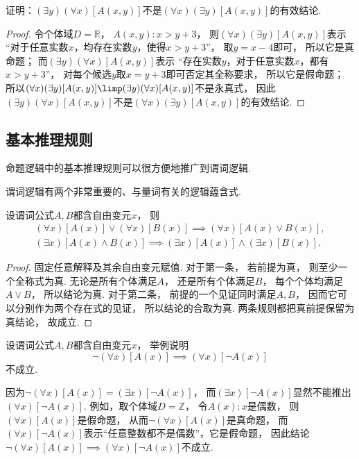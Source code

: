 \begin{example}
证明：\((\exists y)(\forall x)[A(x,y)]\)不是\((\forall x)(\exists y)[A(x,y)]\)的有效结论.
\begin{proof}
令个体域\(D=\mathbb{R}\)，
\(A(x,y): x>y+3\)，
则\((\forall x)(\exists y)[A(x,y)]\)表示
“对于任意实数\(x\)，均存在实数\(y\)，使得\(x>y+3\)”，
        取\(y=x-4\)即可，
        所以它是真命题；
而\((\exists y)(\forall x)[A(x,y)]\)表示
“存在实数\(y\)，对于任意实数\(x\)，都有\(x>y+3\)”，
        对每个候选\(y\)取\(x=y+3\)即可否定其全称要求，
        所以它是假命题；
所以\((\forall x)(\exists y)[A(x,y)] \limp (\exists y)(\forall x)[A(x,y)]\)不是永真式，
因此\((\exists y)(\forall x)[A(x,y)]\)不是\((\forall x)(\exists y)[A(x,y)]\)的有效结论.
\end{proof}
\end{example}

\subsection{基本推理规则}
命题逻辑中的基本推理规则可以很方便地推广到谓词逻辑.

谓词逻辑有两个非常重要的、与量词有关的逻辑蕴含式.
\begin{theorem}\label{theorem:一阶逻辑.基本推理规则}
设谓词公式\(A,B\)都含自由变元\(x\)，
则\begin{gather}
	(\forall x)[A(x)] \lor (\forall x)[B(x)]
	\implies (\forall x)[A(x) \lor B(x)], \\
	(\exists x)[A(x) \land B(x)]
	\implies (\exists x)[A(x)] \land (\exists x)[B(x)].
\end{gather}
    \begin{proof}
        固定任意解释及其余自由变元赋值.
        对于第一条，
        若前提为真，
        则至少一个全称式为真.
        无论是所有个体满足\(A\)，
        还是所有个体满足\(B\)，
        每个个体均满足\(A\lor B\)，
        所以结论为真.
        对于第二条，
        前提的一个见证同时满足\(A,B\)，
        因而它可以分别作为两个存在式的见证，
        所以结论的合取为真.
        两条规则都把真前提保留为真结论，
        故成立.
    \end{proof}
\end{theorem}

\begin{example}
设谓词公式\(A,B\)都含自由变元\(x\)，
举例说明\begin{equation*}
	\neg(\forall x)[A(x)] \implies (\forall x)[\neg A(x)]
\end{equation*}不成立.
\begin{solution}
因为\(
	\neg(\forall x)[A(x)]
	= (\exists x)[\neg A(x)]
\)，
而\((\exists x)[\neg A(x)]\)显然不能推出\((\forall x)[\neg A(x)]\).
例如，取个体域\(D = \mathbb{Z}\)，
令\(A(x): \text{$x$是偶数}\)，
则\((\forall x)[A(x)]\)是假命题，
从而\(\neg(\forall x)[A(x)]\)是真命题，
而\((\forall x)[\neg A(x)]\)表示“任意整数都不是偶数”，它是假命题，
因此结论\(\neg(\forall x)[A(x)] \implies (\forall x)[\neg A(x)]\)不成立.
\end{solution}
\end{example}

